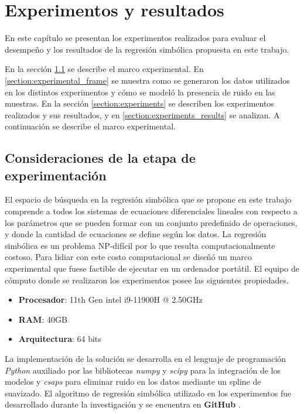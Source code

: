 \chapter{Experimentos y resultados}\label{chapter:results}

En este capítulo se presentan los experimentos realizados para evaluar el desempeño y los resultados de la regresión simbólica propuesta en este trabajo.

En la sección \ref{section:experimental_considerations} se describe el marco experimental. En \ref{section:experimental_frame} se muestra como se generaron los datos utilizados en los distintos experimentos y cómo se modeló la presencia de ruido en las muestras. En la sección \ref{section:experiments} se describen los experimentos realizados y sus resultados, y en \ref{section:experiments_results} se analizan. A continuación se describe el marco experimental.

\section{Consideraciones de la etapa de experimentación}\label{section:experimental_considerations}

El espacio de búsqueda en la regresión simbólica que se propone en este trabajo comprende a todos los sistemas de ecuaciones diferenciales lineales con respecto a los parámetros que se pueden formar con un conjunto predefinido de operaciones, y donde la cantidad de ecuaciones se define según los datos. La regresión simbólica es un problema NP-difícil por lo que resulta computacionalmente costoso. Para lidiar con este costo computacional se diseñó un marco experimental que fuese factible de ejecutar en un ordenador portátil. El equipo de cómputo donde se realizaron los experimentos posee las siguientes propiedades.

\begin{itemize}
    \item \textbf{Procesador}: 11th Gen intel i9-11900H @ 2.50GHz
    \item \textbf{RAM}: 40GB
    \item \textbf{Arquitectura}: 64 bits
\end{itemize}

La implementación de la solución se desarrolla en el lenguaje de programación \emph{Python} auxiliado por las bibliotecas \emph{numpy} \cite{harris2020array} y \emph{scipy} \cite{2020SciPy-NMeth} para la integración de los modelos y \emph{csaps} \cite{csaps} para eliminar ruido en los datos mediante un spline de suavizado. El algoritmo de regresión simbólica utilizado en los experimentos fue desarrollado durante la investigación y se encuentra en \textbf{GitHub} \cite{symbolic-regression}.

